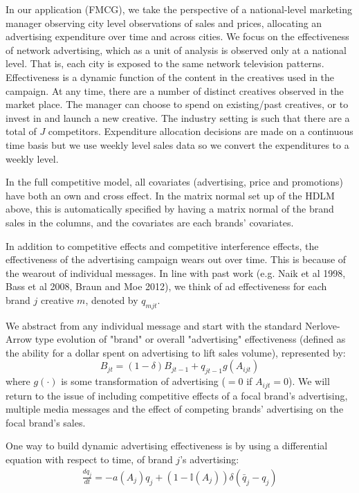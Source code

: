 \documentclass[letter,10pt]{article}
\newcommand{\Igtz}{\mathbb{I}}
\newcommand{\qbar}{\bar{q}}
\begin{document}
In our application (FMCG), we take the perspective of a national-level marketing manager observing city  
level observations of sales and prices, allocating an advertising expenditure over time and across cities.  
We focus on the effectiveness of network advertising, which as a unit of analysis is observed only at a national level.
That is, each city is exposed to the same network television patterns.  Effectiveness is a dynamic function of 
the content in the creatives used in the campaign.  At any time, there are a number of distinct creatives
observed in the market place.  The manager can choose to spend on existing/past creatives, or to invest in 
and launch a new creative.  The industry setting is such that there 
are a total of $J$ competitors.  Expenditure allocation decisions are made on a continuous time basis but 
we use weekly level sales data so we convert the expenditures to a weekly level.  

In the full competitive model, all covariates (advertising, price and promotions) have both an own
and cross effect.   In the matrix normal set up of
the HDLM above, this is automatically specified by having a matrix normal of the brand sales in the columns,
and the covariates are each brands' covariates.  

In addition to competitive effects and competitive interference effects, the effectiveness of
the advertising campaign wears out over time.  This is because of the wearout of individual messages.  
In line with past work (e.g. Naik et al 1998,  Bass et al 2008, Braun and Moe 2012), we think 
of ad effectiveness for each brand $j$ creative $m$, denoted by $q_{mjt}$.  

We abstract from any individual message and 
start with the standard Nerlove-Arrow type evolution of "brand" or overall "advertising"
effectiveness (defined as the ability for a dollar spent on advertising to lift sales volume), represented by:
\begin{equation}
\label{eqn:bqj1}
B_{jt} = (1-\delta) B_{jt-1} + q_{jt-1} g(A_{ijt})  
\end{equation}
where $g(\cdot)$ is some transformation of advertising ($=0$ if
$A_{ijt}=0$).
We will return to the issue of including competitive effects of a focal brand's advertising, multiple media messages
and the effect of competing brands' advertising on the focal brand's sales. 

One way to build dynamic advertising effectiveness is by using a differential equation with respect
to time, of brand $j$'s advertising:
\begin{align}
\frac{dq_j}{dt} = -a(A_j)q_j +(1-\Igtz(A_j)) \delta (\qbar_j - q_j) 
\end{align}
\end{document}
